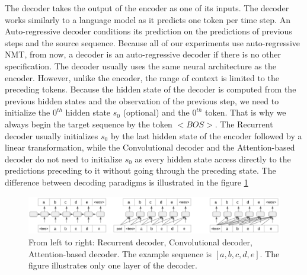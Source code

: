 The decoder takes the output of the encoder as one of its inputs. The decoder works similarly to a language model as it predicts one token per time step. An Auto-regressive decoder conditions its prediction on the predictions of previous steps and the source sequence. Because all of our experiments use auto-regressive NMT, from now, a decoder is an auto-regressive decoder if there is no other specification. The decoder usually uses the same neural architecture as the encoder. However, unlike the encoder, the range of context is limited to the preceding tokens. Because the hidden state of the decoder is computed from the previous hidden states and the observation of the previous step, we need to initialize the $0^{th}$ hidden state $s_0$ (optional) and the $0^{th}$ token. That is why we always begin the target sequence by the token $<BOS>$. The Recurrent decoder usually initializes $s_0$ by the last hidden state of the encoder followed by a linear transformation, while the Convolutional decoder and the Attention-based decoder do not need to initialize $s_0$ as every hidden state access directly to the predictions preceding to it without going through the preceding state. The difference between decoding paradigms is illustrated in the figure \ref{fig:decoding}

\begin{figure}[htbp]
\includegraphics[width=\textwidth]{graphics/decoding.png}
\caption[Illustration of 3 most popular auto-regressive decoding paradigms]{From left to right: Recurrent decoder, Convolutional decoder, Attention-based decoder. The example sequence is $[a,b,c,d,e]$. The figure illustrates only one layer of the decoder.}
\label{fig:decoding}
\end{figure}

